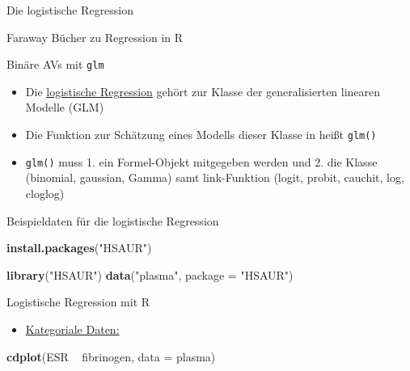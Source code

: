 \documentclass[ignorenonframetext,]{beamer}
\newenvironment{Shaded}{}{}
\newcommand{\KeywordTok}[1]{\textcolor[rgb]{0.00,0.44,0.13}{\textbf{{#1}}}}
\newcommand{\DataTypeTok}[1]{\textcolor[rgb]{0.56,0.13,0.00}{{#1}}}
\newcommand{\StringTok}[1]{\textcolor[rgb]{0.25,0.44,0.63}{{#1}}}
\newcommand{\NormalTok}[1]{{#1}}
\providecommand{\tightlist}{%
\setlength{\itemsep}{0pt}\setlength{\parskip}{0pt}}
\begin{document}
\begin{frame}[fragile]{Die logistische Regression}
\begin{block}{Faraway Bücher zu Regression in R}
\end{block}

\begin{block}{Binäre AVs mit \texttt{glm}}

\begin{itemize}
\tightlist
\item
  Die \href{http://data.princeton.edu/R/glms.html}{logistische
  Regression} gehört zur Klasse der generalisierten linearen Modelle
  (GLM)
\item
  Die Funktion zur Schätzung eines Modells dieser Klasse in heißt
  \texttt{glm()}
\item
  \texttt{glm()} muss 1. ein Formel-Objekt mitgegeben werden und 2. die
  Klasse (binomial, gaussian, Gamma) samt link-Funktion (logit, probit,
  cauchit, log, cloglog)
\end{itemize}

\end{block}

\begin{block}{Beispieldaten für die logistische Regression}

\begin{Shaded}
\begin{Highlighting}[]
\KeywordTok{install.packages}\NormalTok{(}\StringTok{"HSAUR"}\NormalTok{)}
\end{Highlighting}
\end{Shaded}

\begin{Shaded}
\begin{Highlighting}[]
\KeywordTok{library}\NormalTok{(}\StringTok{"HSAUR"}\NormalTok{)}
\KeywordTok{data}\NormalTok{(}\StringTok{"plasma"}\NormalTok{, }\DataTypeTok{package =} \StringTok{"HSAUR"}\NormalTok{)}
\end{Highlighting}
\end{Shaded}

\end{block}

\begin{block}{Logistische Regression mit R}

\begin{itemize}
\tightlist
\item
  \href{http://homepage.univie.ac.at/herbert.nagel/KategorialeDaten.pdf}{Kategoriale
  Daten:}
\end{itemize}

\begin{Shaded}
\begin{Highlighting}[]
\KeywordTok{cdplot}\NormalTok{(ESR ~}\StringTok{ }\NormalTok{fibrinogen, }\DataTypeTok{data =} \NormalTok{plasma)}
\end{Highlighting}
\end{Shaded}


\end{block}
\end{frame}
\end{document}
